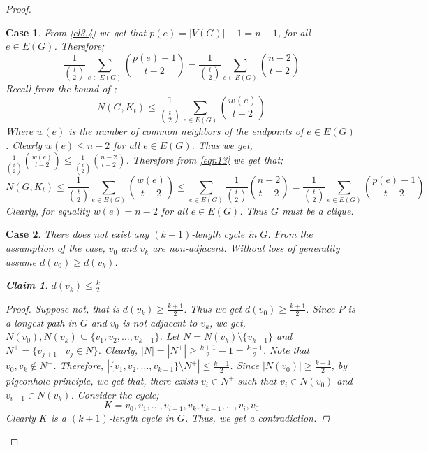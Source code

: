 \documentclass[pdflatex,sn-basic,Numbered]{sn-jnl}
\newtheorem{cl}{Claim}
\newtheorem{case}{Case}
\begin{document}
\begin{proof}
\begin{case}
 From \cref{cl3.4} we get that $p(e) = |V(G)|-1=n-1$, for all $e \in E(G)$. Therefore;
 \begin{equation}\label{eqn13}
     \frac{1}{{t\choose 2}}\sum_{e \in E(G)}{{p(e)-1\choose t-2}} = \frac{1}{{t\choose 2}}\sum_{e \in E(G)}{n-2\choose t-2} 
 \end{equation}
Recall from the bound of ;
\begin{equation*}
    N(G,K_t) \leq \frac{1}{{t\choose 2}}\sum_{e \in E(G)}{w(e) \choose t-2}
\end{equation*}
Where $w(e)$ is the number of common neighbors of the endpoints of $e \in E(G)$. Clearly $w(e) \leq n-2$ for all $e \in E(G)$. Thus we get, $\frac{1}{{t\choose 2}}{w(e) \choose t-2} \leq  \frac{1}{{t\choose 2}}{n-2\choose t-2}$. Therefore from \cref{eqn13} we get that;
\begin{equation}\label{eqn14}
    N(G,K_t) \leq \frac{1}{{t\choose 2}}\sum_{e \in E(G)}{w(e) \choose t-2} \leq \sum_{e \in E(G)} \frac{1}{{t\choose 2}}{n-2\choose t-2} =  \frac{1}{{t\choose 2}}\sum_{e \in E(G)}{{p(e)-1\choose t-2}}
\end{equation}
Clearly, for equality $w(e) = n-2$ for all $e \in E(G)$. Thus $G$ must be a clique.
\end{case}
\begin{case}\label{case2}
        There does not exist any $(k+1)$-length cycle in $G$.
        \newline From the assumption of the case, $v_0$ and $v_k$ are non-adjacent. Without loss of generality assume $d(v_0) \geq d(v_k)$.
\begin{cl}\label{light}
    $d(v_k) \leq \frac{k}{2}$
    \begin{proof}
        Suppose not, that is $d(v_k) \geq \frac{k+1}{2}$. Thus we get $d(v_0) \geq \frac{k+1}{2}$. Since $P$ is a longest path in $G$ and $v_0$ is not adjacent to $v_{k}$, we get, $N(v_0), N(v_k) \subseteq \{v_1,v_2,\dots, v_{k-1}\}$. Let $N = N(v_k) \setminus \{v_{k-1}\}$ and $N^+ = \{v_{j+1} \mid v_j \in N\}$. Clearly, $|N| = |N^+| \geq \frac{k+1}{2}-1 = \frac{k-1}{2}$. Note that $v_0, v_k \notin N^+$. Therefore, $|\{v_1,v_2,\dots,v_{k-1}\} \setminus N^+| \leq \frac{k-1}{2}$. Since $|N(v_0)| \geq \frac{k+1}{2}$, by pigeonhole principle, we get that, there exists $v_i \in N^+$ such that $v_i \in N(v_0)$ and $v_{i-1} \in N(v_k)$. Consider the cycle; $$K = v_0, v_1, \dots, v_{i-1},v_k,v_{k-1},\dots, v_i,v_0$$ Clearly $K$ is a $(k+1)$-length cycle in $G$. Thus, we get a contradiction.
     \end{proof}

\end{cl}
\end{case}
\end{proof}
\end{document}
